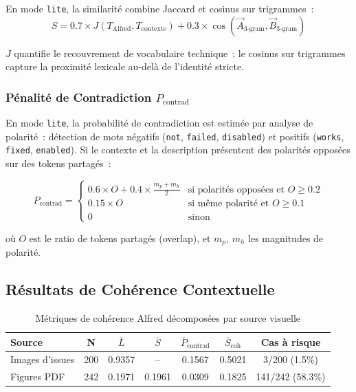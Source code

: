 En mode \texttt{lite}, la similarité combine Jaccard et cosinus sur trigrammes~:
\begin{equation}
S = 0.7 \times J(T_{\text{Alfred}}, T_{\text{contexte}}) + 0.3 \times \cos(\vec{A}_{\text{3-gram}}, \vec{B}_{\text{3-gram}})
\label{eq:semantic_lite}
\end{equation}

$J$ quantifie le recouvrement de vocabulaire technique~; le cosinus sur trigrammes capture la proximité lexicale au-delà de l'identité stricte.

\subsubsection{Pénalité de Contradiction $P_{\text{contrad}}$}

En mode \texttt{lite}, la probabilité de contradiction est estimée par analyse de polarité~: détection de mots négatifs (\texttt{not}, \texttt{failed}, \texttt{disabled}) et positifs (\texttt{works}, \texttt{fixed}, \texttt{enabled}). Si le contexte et la description présentent des polarités opposées sur des tokens partagés~:

\begin{equation}
P_{\text{contrad}} = \begin{cases}
0.6 \times O + 0.4 \times \frac{m_p + m_h}{2} & \text{si polarités opposées et } O \geq 0.2 \\
0.15 \times O & \text{si même polarité et } O \geq 0.1 \\
0 & \text{sinon}
\end{cases}
\label{eq:contradiction}
\end{equation}

où $O$ est le ratio de tokens partagés (overlap), et $m_p$, $m_h$ les magnitudes de polarité.

\subsection{Résultats de Cohérence Contextuelle}
\label{sec:alfred_resultats}

\begin{table}[H]
\centering
\begin{tabular}{lcccccc}
\toprule
\textbf{Source} & \textbf{N} & $\overline{L}$ & $\overline{S}$ & $\overline{P}_{\text{contrad}}$ & $\overline{S}_{\text{coh}}$ & \textbf{Cas à risque} \\
\midrule
Images d'issues & 200 & 0.9357 & -- & 0.1567 & 0.5021 & 3/200 (1.5\%) \\
Figures PDF & 242 & 0.1971 & 0.1961 & 0.0309 & 0.1825 & 141/242 (58.3\%) \\
\bottomrule
\end{tabular}
\caption{Métriques de cohérence Alfred décomposées par source visuelle}
\label{tab:alfred_coherence}
\end{table}

